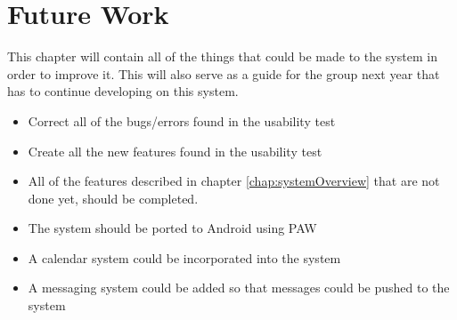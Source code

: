 \chapter{Future Work}
\label{chap:futureWork}
This chapter will contain all of the things that could be made to the system in order to improve it. This will also serve as a guide for the group next year that has to continue developing on this system.
\begin{itemize}
\item Correct all of the bugs/errors found in the usability test
\item Create all the new features found in the usability test
\item All of the features described in chapter \ref{chap:systemOverview} that are not done yet, should be completed.
\item The system should be ported to Android using PAW
\item A calendar system could be incorporated into the system
\item A messaging system could be added so that messages could be pushed to the system
\end{itemize}